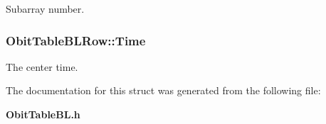 Subarray number. 

\subsubsection{ {\bf Obit\-Table\-BLRow::Time}}\label{structObitTableBLRow_o6}


The center time. 



The documentation for this struct was generated from the following file:\begin{CompactItemize}
\item 
{\bf Obit\-Table\-BL.h}\end{CompactItemize}
